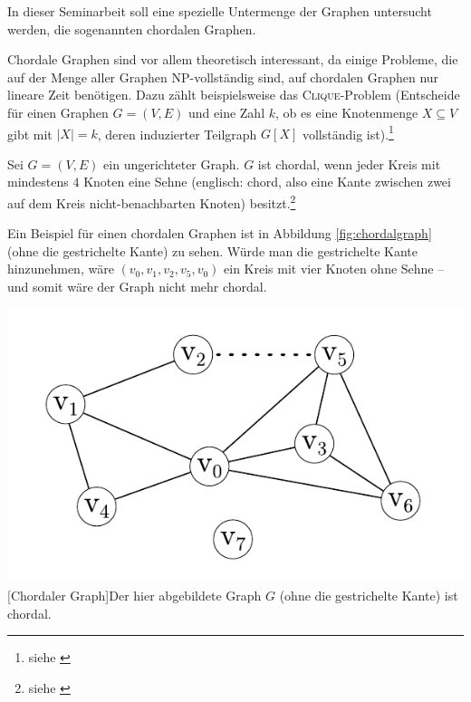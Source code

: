 In dieser Seminarbeit soll eine spezielle Untermenge der Graphen un\-ter\-sucht werden, die sogenannten chordalen Graphen.

Chordale Graphen sind vor allem theoretisch interessant, da einige Probleme, die auf der Menge aller Graphen NP-vollständig sind, auf chordalen Graphen nur lineare Zeit benötigen. Dazu zählt beispielsweise das \textsc{Clique}-Problem (Entscheide für einen Graphen \( G = \left( V, E \right) \) und eine Zahl \( k \), ob es eine Knotenmenge \( X \subseteq V \) gibt mit \( \left| X \right| = k \), deren induzierter Teilgraph \( G \left[ X \right] \) vollständig ist).\footnote{siehe \cite[Satz 4.17]{golumbic}}%

\begin{definition}
	Sei \( G = \left( V, E \right)\) ein ungerichteter Graph.\linebreak{}
	\( G \) ist chordal, wenn jeder Kreis mit mindestens \( 4 \) Knoten eine Sehne (englisch: chord, also eine Kante zwischen zwei auf dem Kreis nicht-benachbarten Knoten) besitzt.\footnote{siehe \cite[Kapitel 4.1]{golumbic}}
\end{definition}

Ein Beispiel für einen chordalen Graphen ist in Abbildung \ref{fig:chordalgraph} (ohne die gestrichelte Kante) zu sehen. Würde man die gestrichelte Kante hinzunehmen, wäre \( \left( v_0, v_1, v_2, v_5, v_0 \right) \) ein Kreis mit vier Knoten ohne Sehne -- und somit wäre der Graph nicht mehr chordal.

\vspace{1em}
\begin{minipage}{\linewidth}
	\centering
	\includegraphics[scale=0.9]{img/graph/chordal.pdf}
	[Chordaler Graph]{Der hier abgebildete Graph \( G \) (ohne die gestrichelte Kante) ist chordal.}
	\label{fig:chordalgraph}
\end{minipage}

